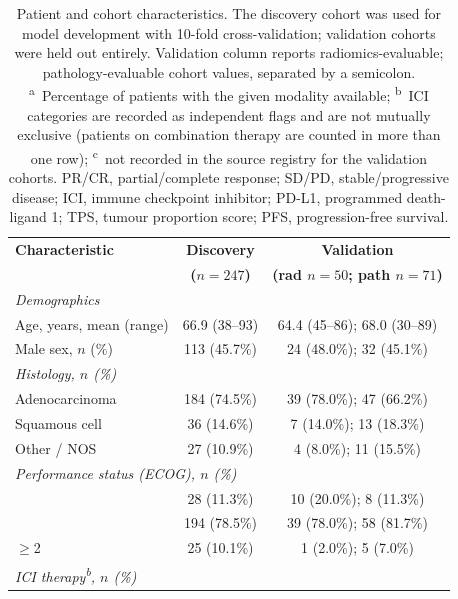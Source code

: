 \begin{table}[H]
\caption{Patient and cohort characteristics.
  The discovery cohort was used for model development with 10-fold
  cross-validation; validation cohorts were held out entirely.
  Validation column reports radiomics-evaluable; pathology-evaluable cohort
  values, separated by a semicolon.
  \textsuperscript{a}~Percentage of patients with the given modality
  available; \textsuperscript{b}~ICI categories are recorded as independent
  flags and are not mutually exclusive (patients on combination therapy are
  counted in more than one row); \textsuperscript{c}~not recorded in the
  source registry for the validation cohorts.
  PR/CR, partial/complete response; SD/PD, stable/progressive disease;
  ICI, immune checkpoint inhibitor; PD-L1, programmed death-ligand 1;
  TPS, tumour proportion score; PFS, progression-free survival.}
\label{tab:patients}
\begin{tabular}{lcc}
\toprule
\textbf{Characteristic} & \textbf{Discovery} & \textbf{Validation} \\
                        & \textbf{($n = 247$)} & \textbf{(rad $n=50$; path $n=71$)} \\
\midrule
\multicolumn{3}{l}{\textit{Demographics}} \\
\quad Age, years, mean (range)  & 66.9 (38--93) & 64.4 (45--86); 68.0 (30--89) \\
\quad Male sex, $n$ (\%)        & 113 (45.7\%) & 24 (48.0\%); 32 (45.1\%) \\
\midrule
\multicolumn{3}{l}{\textit{Histology, $n$ (\%)}} \\
\quad Adenocarcinoma            & 184 (74.5\%) & 39 (78.0\%); 47 (66.2\%) \\
\quad Squamous cell             & 36 (14.6\%) & 7 (14.0\%); 13 (18.3\%) \\
\quad Other / NOS               & 27 (10.9\%) & 4 (8.0\%); 11 (15.5\%) \\
\midrule
\multicolumn{3}{l}{\textit{Performance status (ECOG), $n$ (\%)}} \\
\quad 0                         & 28 (11.3\%) & 10 (20.0\%); 8 (11.3\%) \\
\quad 1                         & 194 (78.5\%) & 39 (78.0\%); 58 (81.7\%) \\
\quad $\geq$2                   & 25 (10.1\%) & 1 (2.0\%); 5 (7.0\%) \\
\midrule
\multicolumn{3}{l}{\textit{ICI therapy\textsuperscript{b}, $n$ (\%)}} \\

\end{tabular}
\end{table}
